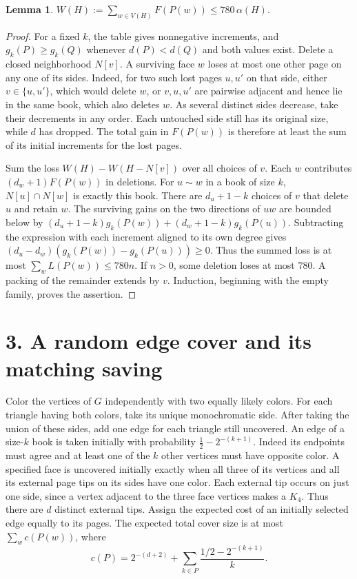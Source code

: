 \documentclass[11pt,a4paper]{article}
\newtheorem{lemma}[theorem]{Lemma}
\newcommand{\NN}{N}
\begin{document}
\begin{lemma}\label{lem:pot}
\(\displaystyle W(H):=\sum_{w\in V(H)}F(P(w))\le780\,\alpha(H).\)
\end{lemma}
\begin{proof}
For a fixed \(k\), the table gives nonnegative increments, and
\(g_k(P)\ge g_k(Q)\) whenever \(d(P)<d(Q)\) and both values exist.
Delete a closed neighborhood \(\NN[v]\). A surviving face \(w\) loses
at most one other page on any one of its sides. Indeed, for two such
lost pages \(u,u'\) on that side, either \(v\in\{u,u'\}\), which would
delete \(w\), or \(v,u,u'\) are pairwise adjacent and hence lie in
the same book, which also deletes \(w\). As several distinct sides
decrease, take their decrements in any order. Each untouched side still
has its original size, while \(d\) has dropped. The total gain in \(F(P(w))\)
is therefore at least the sum of its initial increments for the lost pages.

Sum the loss \(W(H)-W(H-\NN[v])\) over all choices of \(v\).
Each \(w\) contributes \((d_w+1)F(P(w))\) in deletions. For \(u\sim w\)
in a book of size \(k\), \(\NN[u]\cap\NN[w]\) is exactly this book.
There are \(d_u+1-k\) choices of \(v\) that delete \(u\) and retain \(w\).
The surviving gains on the two directions of \(uw\) are bounded below by
\((d_u+1-k)g_k(P(w))+(d_w+1-k)g_k(P(u))\).
Subtracting the expression with each increment aligned to its own degree
gives \((d_u-d_w)(g_k(P(w))-g_k(P(u)))\ge0\). Thus the summed loss
is at most \(\sum_w L(P(w))\le780n\). If \(n>0\), some deletion loses
at most 780. A packing of the remainder extends by \(v\).
Induction, beginning with the empty family, proves the assertion.
\end{proof}

\newpage
\section*{3. A random edge cover and its matching saving}

Color the vertices of \(G\) independently with two equally likely colors.
For each triangle having both colors, take its unique monochromatic side.
After taking the union of these sides, add one edge for each triangle still
uncovered. An edge of a size-\(k\) book is taken initially with probability
\(\frac12-2^{-(k+1)}\). Indeed its endpoints must agree and at least one
of the \(k\) other vertices must have opposite color. A specified face
is uncovered initially exactly when all three of its vertices and all its
external page tips on its sides have one color. Each external tip occurs on
just one side, since a vertex adjacent to the three face vertices makes
a \(K_4\). Thus there are \(d\) distinct external tips. Assign the expected
cost of an initially selected edge equally to its pages. The expected total
cover size is at most \(\sum_w c(P(w))\), where
\begin{equation}\label{eq:color}
c(P)=2^{-(d+2)}+\sum_{k\in P}\frac{1/2-2^{-(k+1)}}{k}.
\end{equation}
\end{document}
